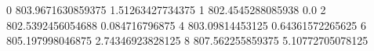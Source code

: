 0 803.9671630859375 1.51263427734375
1 802.4545288085938 0.0
2 802.5392456054688 0.084716796875
4 803.09814453125 0.64361572265625
6 805.197998046875 2.74346923828125
8 807.562255859375 5.10772705078125
